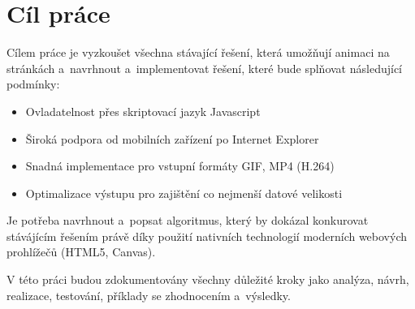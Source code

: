 \chapter{Cíl práce}

Cílem práce je vyzkoušet všechna stávající řešení, která umožňují animaci na stránkách a~navrhnout a~implementovat řešení, které bude  splňovat následující podmínky: 
\begin{itemize}
  \item Ovladatelnost přes skriptovací jazyk Javascript
  \item Široká podpora od mobilních zařízení po Internet Explorer
  \item Snadná implementace pro vstupní formáty GIF, MP4 (H.264)
  \item Optimalizace výstupu pro zajištění co nejmenší datové velikosti
\end{itemize}

Je potřeba navrhnout a~popsat algoritmus, který by dokázal konkurovat stávájícím řešením právě díky použití nativních technologií moderních webových prohlížečů (HTML5, Canvas). 

V této práci budou zdokumentovány všechny důležité kroky jako analýza, návrh, realizace, testování, příklady se zhodnocením a~výsledky. 